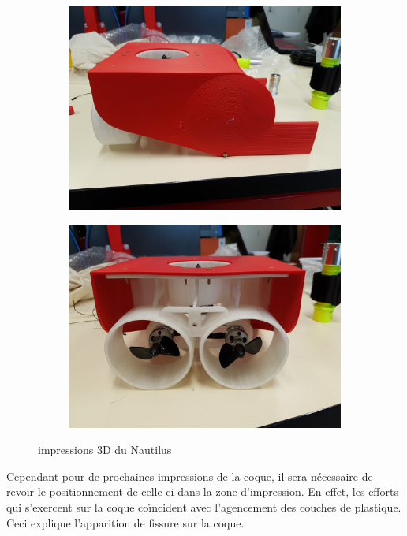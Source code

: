 \documentclass[a4paper,11pt]{report}
\begin{document}
				\begin{figure}[!h]
						\centering
							\begin{subfigure}[b]{0.3\textwidth}
								\includegraphics[width=\textwidth]{Photos/Capture15.jpg}
							\end{subfigure}
							\begin{subfigure}[b]{0.3\textwidth}
								\includegraphics[width=\textwidth]{Photos/Capture16.jpg}
							\end{subfigure}
							\caption{impressions 3D du Nautilus}
					\end{figure}
					
					Cependant pour de prochaines impressions de la coque, il sera nécessaire de revoir le positionnement de celle-ci dans la zone d'impression. En effet, les efforts qui s'exercent sur la coque coïncident avec l'agencement des couches de plastique. Ceci explique l'apparition de fissure sur la coque.
					
\end{document}
